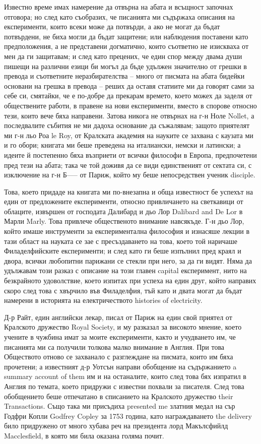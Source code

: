 \documentclass[12pt]{book}
\begin{document}
Известно време имах намерение да отвърна на абата и всъщност започнах отговора; но след като съобразих, че писанията ми съдържаха описания на експерименти, които всеки може да потвърди, а ако не могат да бъдат потвърдени, не биха могли да бъдат защитени; или наблюдения поставени като предположения, а не представени догматично, които съответно не изискваха от мен да ги защитавам; и след като прецених, че един спор между двама души пишещи на различни езици би могъл да бъде удължен значително от грешки в превода и съответните неразбирателства – много от писмата на абата бидейки основани на грешка в превода – реших да оставя статиите ми да говорят сами за себе си, смятайки, че е по-добре да прекарам времето, което можех да заделя от обществените работи, в правене на нови експерименти, вместо в спорове относно тези, които вече бяха направени. Затова никога не отвърнах на г-н Ноле Nollet, а последвалите събития не ми дадоха основание да съжалявам; защото приятелят ми г-н льо Роа le Roy, от Кралската академия на науките се захвана с каузата ми и го обори; книгата ми беше преведена на италиански, немски и латински; а идеите й постепенно бяха възприети от всички философи в Европа, предпочетени пред тези на абата; така че той доживя да се види единственият от сектата си, с изключение на г-н Б----- от Париж, който му беше непосредствен ученик disciple. 

Това, което придаде на книгата ми по-внезапна и обща известност бе успехът на един от предложените експерименти, относно привличането на светкавици от облаците, извършен от господата Далибард и дьо Лор Dalibard and De Lor в Марли Marly. Това привлече общественото внимание навсякъде. Г-н дьо Лор, който имаше инструменти за експериментална философия и изнасяше лекции в тази област на науката се зае с пресъздаването на това, което той наричаше Филаделфийските експерименти; и след като ги беше изпълнил пред краял и двора, всички любопитни парижани се стекли при него, за да ги видят. Няма да удължавам този разказ с описание на този главен capital експеримент, нито на безкрайното удоволствие, което изпитах при успеха на един друг, който направих скоро след това с хвърчило във Филаделфия, тъй като и двата могат да бъдат намерени в историята на електричеството histories of electricity. 

Д-р Райт, един английски лекар, писал от Париж на един свой приятел от Кралското дружество Royal Society, и му разказал за високото мнение, което учените в чужбина имат за моите експерименти, както и учудването им, че писанията ми са получили толкова малко внимание в Англия. При това Обществото отново се захванало с разглеждане на писмата, които им бяха прочетени; а известният д-р Уотсън направи обобщение на съдържанието a summary account of them им и на останалите, които след това бях изпратил в Англия по темата, което придружи с известни похвали за писателя. След това обобщението беше отпечатано в списанието на Кралското дружество their Transactions. Също така ми присъдиха presented me златния медал на сър Годфри Копли Godfrey Copley за 1753 година, като награждаването the delivery било придружено от много хубава реч на президента лорд Макълсфийлд Macclesfield, в която ми била оказана голяма почит. 
\end{document}
